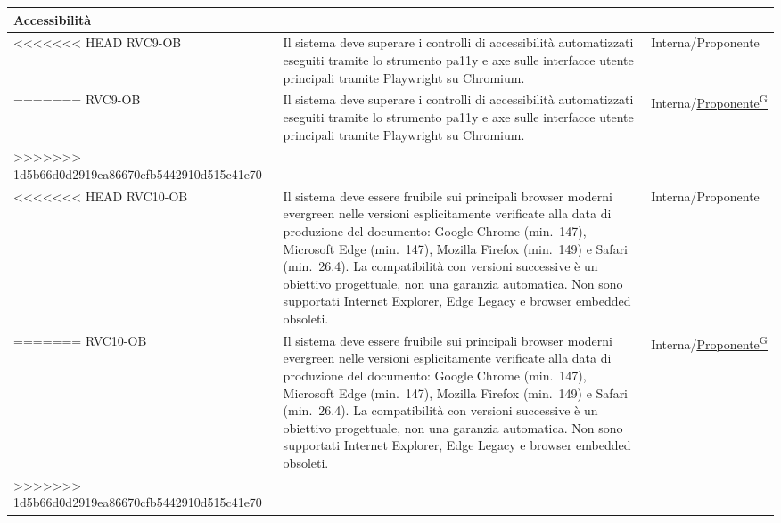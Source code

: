 ﻿\documentclass[a4paper,12pt]{article}
\providecommand{\glslink}[2]{\href{https://alittlebyte-19.github.io/Documentazione/glossario.html\#gls-#1}{\underline{#2}\textsuperscript{\scriptsize G}}}
\begin{document}
\begin{description}[style=multiline, leftmargin=4cm, font=\bfseries]
\begin{enumerate}[leftmargin=*, nosep]
{\begin{longtable}{|p{2.5cm}|p{9.5cm}|p{3.5cm}|}
    \multicolumn{3}{|l|}{\cellcolor{gray!12}\textbf{Accessibilità}} \\
    \hline
<<<<<<< HEAD
    RVC9-OB & Il sistema deve superare i controlli di accessibilità automatizzati eseguiti tramite lo strumento pa11y e axe sulle interfacce utente principali tramite Playwright su Chromium. & Interna/Proponente \\
=======
    RVC9-OB & Il sistema deve superare i controlli di accessibilità automatizzati eseguiti tramite lo strumento pa11y e axe sulle interfacce utente principali tramite Playwright su Chromium. & Interna/\glslink{committente-proponente}{Proponente} \\
>>>>>>> 1d5b66d0d2919ea86670cfb5442910d515c41e70
    \hline

    \multicolumn{3}{|l|}{\cellcolor{gray!12}\textbf{Browser supportati}} \\
    \hline
<<<<<<< HEAD
    RVC10-OB & Il sistema deve essere fruibile sui principali browser moderni evergreen nelle versioni esplicitamente verificate alla data di produzione del documento: Google Chrome (min.\ 147), Microsoft Edge (min.\ 147), Mozilla Firefox (min.\ 149) e Safari (min.\ 26.4). La compatibilità con versioni successive è un obiettivo progettuale, non una garanzia automatica. Non sono supportati Internet Explorer, Edge Legacy e browser embedded obsoleti. & Interna/Proponente \\
=======
    RVC10-OB & Il sistema deve essere fruibile sui principali browser moderni evergreen nelle versioni esplicitamente verificate alla data di produzione del documento: Google Chrome (min.\ 147), Microsoft Edge (min.\ 147), Mozilla Firefox (min.\ 149) e Safari (min.\ 26.4). La compatibilità con versioni successive è un obiettivo progettuale, non una garanzia automatica. Non sono supportati Internet Explorer, Edge Legacy e browser embedded obsoleti. & Interna/\glslink{committente-proponente}{Proponente} \\
>>>>>>> 1d5b66d0d2919ea86670cfb5442910d515c41e70
    \hline


\end{longtable}}
\end{enumerate}
\end{description}
\end{document}
